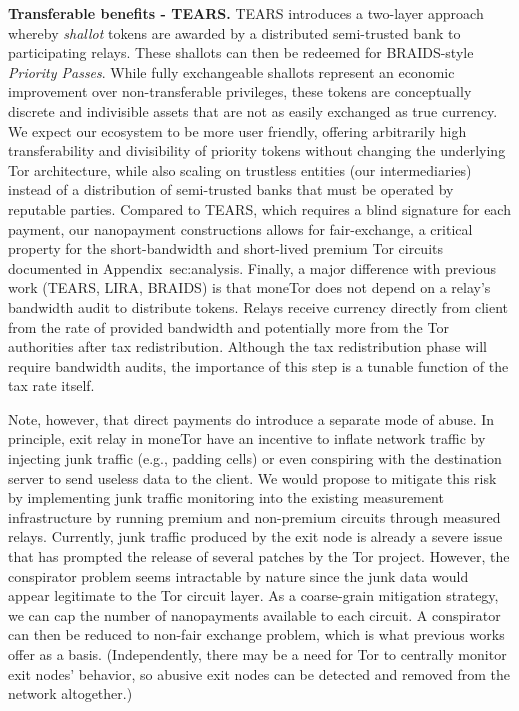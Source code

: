 

\medskip\noindent\textbf{Transferable benefits - TEARS.} TEARS introduces a
two-layer approach whereby \emph{shallot} tokens are awarded by a distributed
semi-trusted bank to participating relays. These shallots
can then be redeemed for BRAIDS-style \emph{Priority Passes}.
While fully exchangeable shallots represent an economic improvement over
non-transferable privileges, these tokens are conceptually discrete and
indivisible assets that are not as easily exchanged as true currency. We expect
our ecosystem to be more user friendly, offering arbitrarily high
transferability and divisibility of priority tokens without changing the
underlying Tor architecture, while also scaling on trustless entities (our
intermediaries) instead of a distribution of semi-trusted banks that must be
operated by reputable parties. Compared to TEARS, which requires a blind
signature for each payment, our nanopayment constructions allows for
fair-exchange, a critical property for the short-bandwidth and short-lived
premium Tor circuits documented in Appendix~{sec:analysis}. Finally, a major
difference with previous work (TEARS, LIRA, BRAIDS) is that moneTor does not
depend on a relay's bandwidth audit to distribute tokens. Relays receive
currency directly from client from the rate of provided bandwidth and
potentially more from the Tor authorities after tax redistribution. Although the
tax redistribution phase will require bandwidth audits, the importance of this
step is a tunable function of the tax rate itself.

Note, however, that direct
payments do introduce a separate mode of abuse. In principle, exit relay in
moneTor have an incentive to inflate network traffic by injecting junk traffic
(e.g., padding cells) or even conspiring with the destination server to send
useless data to the client. We would propose to mitigate this risk by
implementing junk traffic monitoring into the existing measurement
infrastructure by running premium and non-premium circuits through measured
relays. Currently, junk traffic produced by the exit node is already a severe
issue~\cite{rochet2018dropping} that has prompted the release of several patches
by the Tor project. However, the conspirator problem seems intractable
by nature since the junk data would appear legitimate to the Tor circuit layer.
As a coarse-grain mitigation strategy, we can cap the number of nanopayments
available to each circuit. A conspirator can then be reduced to non-fair
exchange problem, which is what previous works offer as a
basis. 
%
(Independently, there may be a need for Tor to centrally monitor exit
nodes' behavior, so abusive exit nodes can be detected and removed
from the network altogether.)

